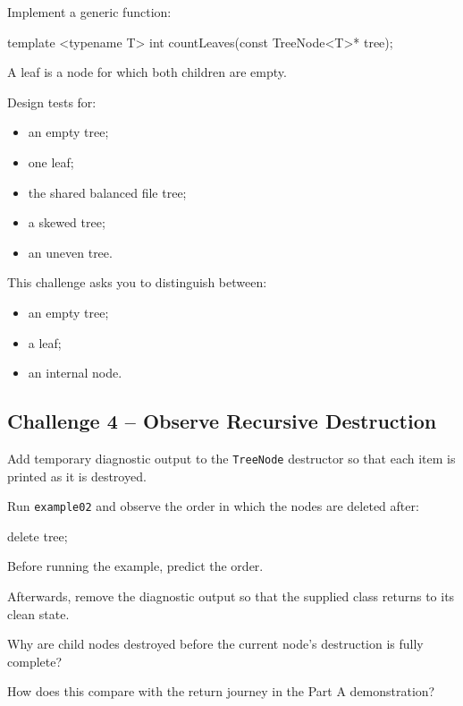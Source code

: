 \documentclass{csc2059practical}
\begin{document}
Implement a generic function:

\begin{cppcode}
template <typename T>
int countLeaves(const TreeNode<T>* tree);
\end{cppcode}

A leaf is a node for which both children are empty.

Design tests for:

\begin{itemize}
    \item an empty tree;
    \item one leaf;
    \item the shared balanced file tree;
    \item a skewed tree;
    \item an uneven tree.
\end{itemize}

This challenge asks you to distinguish between:

\begin{itemize}
    \item an empty tree;
    \item a leaf;
    \item an internal node.
\end{itemize}

\subsection{Challenge 4 -- Observe Recursive Destruction}

Add temporary diagnostic output to the \texttt{TreeNode} destructor so
that each item is printed as it is destroyed.

Run \texttt{example02} and observe the order in which the nodes are
deleted after:

\begin{cppcode}
delete tree;
\end{cppcode}

Before running the example, predict the order.

Afterwards, remove the diagnostic output so that the supplied class returns to
its clean state.

\begin{reflectionbox}
Why are child nodes destroyed before the current node's destruction is fully
complete?

How does this compare with the return journey in the Part A demonstration?
\end{reflectionbox}
\end{document}
